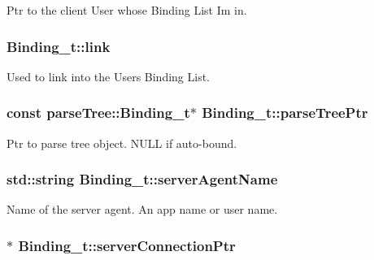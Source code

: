 Ptr to the client User whose Binding List I\textquotesingle{}m in. 

\subsubsection[{\texorpdfstring{link}{link}}]{ Binding\+\_\+t\+::link}\hypertarget{struct_binding__t_a7f2da1ff2af0c87f89064998398cf9e3}{}\label{struct_binding__t_a7f2da1ff2af0c87f89064998398cf9e3}


Used to link into the User\textquotesingle{}s Binding List. 

\subsubsection[{\texorpdfstring{parse\+Tree\+Ptr}{parseTreePtr}}]{\setlength{\rightskip}{0pt plus 5cm}const {\bf parse\+Tree\+::\+Binding\+\_\+t}$\ast$ Binding\+\_\+t\+::parse\+Tree\+Ptr}\hypertarget{struct_binding__t_ac069eee4a0e09669e9f74c07fec8a8e8}{}\label{struct_binding__t_ac069eee4a0e09669e9f74c07fec8a8e8}


Ptr to parse tree object. N\+U\+LL if auto-\/bound. 

\subsubsection[{\texorpdfstring{server\+Agent\+Name}{serverAgentName}}]{\setlength{\rightskip}{0pt plus 5cm}std\+::string Binding\+\_\+t\+::server\+Agent\+Name}\hypertarget{struct_binding__t_a43b48ebab9d27ace98004af0b6249a17}{}\label{struct_binding__t_a43b48ebab9d27ace98004af0b6249a17}


Name of the server agent. An app name or user name. 

\subsubsection[{\texorpdfstring{server\+Connection\+Ptr}{serverConnectionPtr}}]{$\ast$ Binding\+\_\+t\+::server\+Connection\+Ptr}\hypertarget{struct_binding__t_a04269836a8e69839b361a0712a1bc6aa}{}\label{struct_binding__t_a04269836a8e69839b361a0712a1bc6aa}


